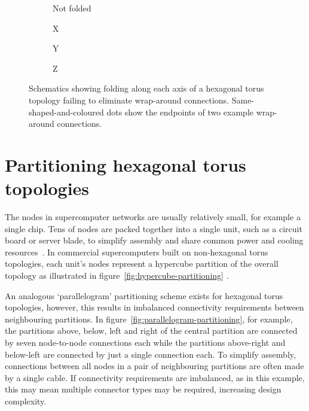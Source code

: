		\begin{figure}
			\center
			\begin{subfigure}[b]{0.24\linewidth}
				\center
				\caption{Not folded}
				\label{fig:failing-to-fold-hex-toruses-none}
			\end{subfigure}
			\begin{subfigure}[b]{0.24\linewidth}
				\center
				\caption{X}
				\label{fig:failing-to-fold-hex-toruses-x}
			\end{subfigure}
			\begin{subfigure}[b]{0.24\linewidth}
				\center
				\caption{Y}
				\label{fig:failing-to-fold-hex-toruses-y}
			\end{subfigure}
			\begin{subfigure}[b]{0.24\linewidth}
				\center
				\caption{Z}
				\label{fig:failing-to-fold-hex-toruses-z}
			\end{subfigure}
			
			\caption[Folding each axis of a hexagonal torus topology.]%
			{Schematics showing folding along each axis of a hexagonal torus topology
			failing to eliminate wrap-around connections.  Same-shaped-and-coloured
			dots show the endpoints of two example wrap-around connections.}
			\label{fig:failing-to-fold-hex-toruses}
		\end{figure}
	
	\section{Partitioning hexagonal torus topologies}
		
		The nodes in supercomputer networks are usually relatively small, for
		example a single chip. Tens of nodes are packed together into a single
		unit, such as a circuit board or server blade, to simplify assembly and
		share common power and cooling resources~\cite{gilge14,ajima12}. In
		commercial supercomputers built on non-hexagonal torus topologies, each
		unit's nodes represent a hypercube partition of the overall topology as
		illustrated in figure~\ref{fig:hypercube-partitioning}
		\cite{chen11,ajima12}.
		
		An analogous `parallelogram' partitioning scheme exists for hexagonal torus
		topologies, however, this results in imbalanced connectivity requirements
		between neighbouring partitions. In
		figure~\ref{fig:parallelogram-partitioning}, for example, the partitions
		above, below, left and right of the central partition are connected by
		seven node-to-node connections each while the partitions above-right and
		below-left are connected by just a single connection each. To simplify
		assembly, connections between all nodes in a pair of neighbouring
		partitions are often made by a single cable. If connectivity requirements
		are imbalanced, as in this example, this may mean multiple connector types
		may be required, increasing design complexity.
		
